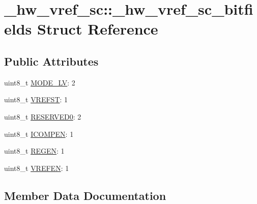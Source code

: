 \hypertarget{struct__hw__vref__sc_1_1__hw__vref__sc__bitfields}{}\section{\+\_\+hw\+\_\+vref\+\_\+sc\+:\+:\+\_\+hw\+\_\+vref\+\_\+sc\+\_\+bitfields Struct Reference}
\label{struct__hw__vref__sc_1_1__hw__vref__sc__bitfields}
\subsection*{Public Attributes}
\begin{DoxyCompactItemize}
\item 
uint8\+\_\+t \hyperlink{struct__hw__vref__sc_1_1__hw__vref__sc__bitfields_af298697cb2732646bafb1643af6e9cbb}{M\+O\+D\+E\+\_\+\+LV}\+: 2
\item 
uint8\+\_\+t \hyperlink{struct__hw__vref__sc_1_1__hw__vref__sc__bitfields_a4fd4cd90f8ecd588c18ba21c39de529f}{V\+R\+E\+F\+ST}\+: 1
\item 
uint8\+\_\+t \hyperlink{struct__hw__vref__sc_1_1__hw__vref__sc__bitfields_a00f7d40c62417d70d7deba557077b0db}{R\+E\+S\+E\+R\+V\+E\+D0}\+: 2
\item 
uint8\+\_\+t \hyperlink{struct__hw__vref__sc_1_1__hw__vref__sc__bitfields_a360c18994d2e0d3bfe913d16915e792a}{I\+C\+O\+M\+P\+EN}\+: 1
\item 
uint8\+\_\+t \hyperlink{struct__hw__vref__sc_1_1__hw__vref__sc__bitfields_a6364256929af43a96a6f348fd9a1a34c}{R\+E\+G\+EN}\+: 1
\item 
uint8\+\_\+t \hyperlink{struct__hw__vref__sc_1_1__hw__vref__sc__bitfields_ad39d905cacc01ee6c6789f478b962929}{V\+R\+E\+F\+EN}\+: 1
\end{DoxyCompactItemize}


\subsection{Member Data Documentation}
